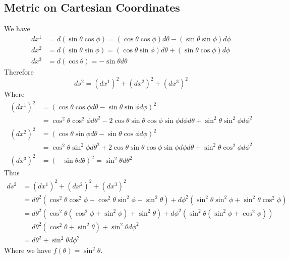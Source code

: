 \documentclass{article}
\begin{document}
		\subsection{Metric on Cartesian Coordinates}
			We have
			\begin{align*}
				dx^1 &= d(\sin \theta \cos \phi) = (\cos\theta \cos \phi) d\theta - (\sin \theta \sin \phi)d \phi \\
				dx^2 &= d(\sin \theta \sin \phi) = (\cos \theta \sin \phi) d\theta + (\sin \theta \cos \phi) d \phi \\
				dx^3 &= d(\cos\theta) = -\sin \theta d\theta
			\end{align*}
			Therefore
			$$ ds^2 = (dx^1)^2+(dx^2)^2+(dx^3)^2$$
			Where
			\begin{align*}
				(dx^1)^2 &= (\cos\theta \cos \phi d \theta - \sin \theta \sin \phi d \phi)^2 \\
				&= \cos^2 \theta \cos^2 \phi d\theta^2 - 2 \cos \theta \sin \theta \cos \phi \sin \phi d \phi d \theta + \sin^2\theta \sin^2\phi d\phi^2 \\
				(dx^2)^2 &= (\cos\theta \sin \phi d \theta - \sin \theta \cos \phi d \phi)^2 \\
				&= \cos^2 \theta \sin^2 \phi d\theta^2 + 2 \cos \theta \sin \theta \cos \phi \sin \phi d \phi d \theta + \sin^2\theta \cos^2\phi d\phi^2 \\
				(dx^3)^2 &= (-\sin\theta d \theta)^2 = \sin^2 \theta d \theta^2
			\end{align*}
			Thus
			\begin{align*}
				ds^2 &= (dx^1)^2+(dx^2)^2+(dx^3)^2 \\
				&= d\theta^2 \left( \cos^2 \theta \cos^2 \phi + \cos^2 \theta \sin^2 \phi + \sin^2 \theta \right) + d\phi^2 \left( \sin^2 \theta \sin^2 \phi + \sin^2 \theta \cos^2 \phi \right) \\
				&= d\theta^2 \left( \cos^2 \theta (\cos^2 \phi + \sin^2 \phi) + \sin^2 \theta \right) + d\phi^2 \left( \sin^2 \theta (\sin^2 \phi + \cos^2 \phi) \right) \\
				&= d\theta^2 \left( \cos^2\theta + \sin^2 \theta \right) + \sin^2 \theta d\phi^2 \\
				&= d\theta^2 + \sin^2\theta d\phi^2
			\end{align*}
			Where we have $f(\theta) = \sin^2 \theta$.
			\pagebreak
\end{document}
